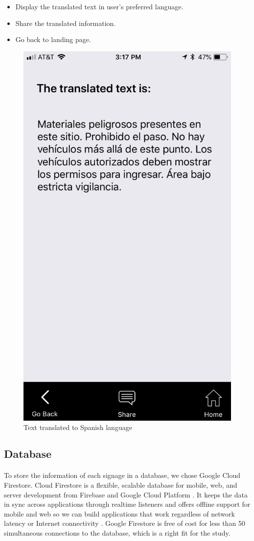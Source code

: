 \documentclass[12pt]{article}
\begin{document}
\begin{itemize}
	\item Display the translated text in user's preferred language.
	\item Share the translated information.
	\item Go back to landing page.
\end{itemize}




\begin{figure}[H]
	\centering
	\includegraphics[width=0.5\linewidth]{media/beacon3.PNG}
	\caption{Text translated to Spanish language}
	\label{fig:beaconSpanish}
\end{figure} 






\subsection{Database}
\label{database}
\paragraph{}To store the information of each signage in a database, we chose Google Cloud Firestore. Cloud Firestore is a flexible, scalable database for mobile, web, and server development from Firebase and Google Cloud Platform \cite{firebase}. It keeps the data in sync across applications through realtime listeners and offers offline support for mobile and web so we can build applications that work regardless of network latency or Internet connectivity \cite{firebase}. Google Firestore is free of cost for less than 50 simultaneous connections to the database, which is a right fit for the study.
\end{document}
